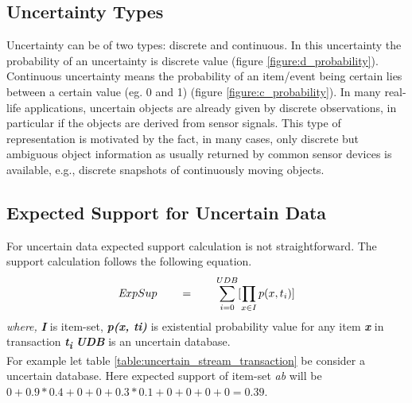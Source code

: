 \subsection{Uncertainty Types}
Uncertainty can be of two types: discrete and continuous. In this uncertainty the probability of an uncertainty is discrete value (figure \ref{figure:d_probability}). Continuous uncertainty means the probability of an item/event being certain lies between a certain value (eg. 0 and 1) (figure \ref{figure:c_probability}). In many real-life applications, uncertain objects are already given by discrete observations, in particular if the objects are derived from sensor signals. This type of representation is motivated by the fact, in many cases, only discrete but ambiguous object information as usually returned by common sensor devices is available, e.g., discrete snapshots of continuously moving objects.

\subsection{Expected Support for Uncertain Data}
For uncertain data expected support calculation is not straightforward. The support calculation follows the following equation.
    \begin{equation}
    \emph ExpSup \qquad = \qquad \sum_{i = 0}^{UDB} [\prod_{x \in I } p(x , t_i)]
    \end{equation}
\emph {where,}    \textbf{\emph {I}} is item-set,    \textbf{\emph { p(x, ti)}} is existential probability value for any item \textbf{\emph {x}} in transaction \textbf{\emph {t\textsubscript{i}}} \textbf{\emph {UDB}} is an uncertain database.\\
For example let table \ref{table:uncertain_stream_transaction} be consider a uncertain database. Here expected support of item-set \emph{ab} will be $0+0.9*0.4+0+0+0.3*0.1+0+0+0+0=0.39$.

